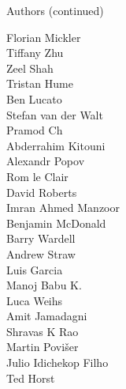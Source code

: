 \documentclass[xcolor=svgnames]{beamer}
\begin{document}
\begin{frame}{Authors (continued)}
\begin{multicols}{5}
          Florian Mickler\\
          Tiffany Zhu\\
          Zeel Shah\\
          Tristan Hume\\
          Ben Lucato\\
          Stefan van der Walt\\
          Pramod Ch\\
          Abderrahim Kitouni\\
          Alexandr Popov\\
          Rom le Clair\\
          David Roberts\\
          Imran Ahmed Manzoor\\
          Benjamin McDonald\\
          Barry Wardell\\
          Andrew Straw\\
          Luis Garcia\\
          Manoj Babu K.\\
          Luca Weihs\\
          Amit Jamadagni\\
          Shravas K Rao\\
          Martin Povišer\\
          Julio Idichekop Filho\\
          Ted Horst\\
    \end{multicols}
  \end{frame}
\end{document}
